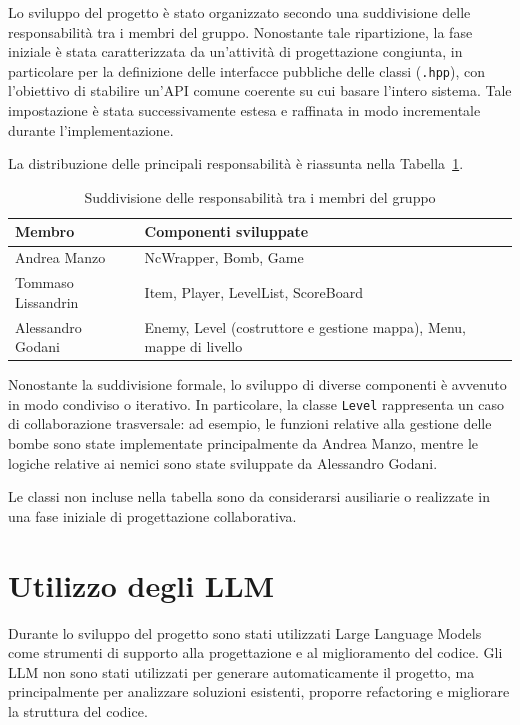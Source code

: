 \documentclass[a4paper,11pt]{article}
\begin{document}
Lo sviluppo del progetto è stato organizzato secondo una suddivisione delle responsabilità tra i membri del gruppo. 
Nonostante tale ripartizione, la fase iniziale è stata caratterizzata da un'attività di progettazione congiunta, 
in particolare per la definizione delle interfacce pubbliche delle classi (\texttt{.hpp}), 
con l'obiettivo di stabilire un'API comune coerente su cui basare l'intero sistema. 
Tale impostazione è stata successivamente estesa e raffinata in modo incrementale durante l'implementazione.

La distribuzione delle principali responsabilità è riassunta nella Tabella~\ref{tab:suddivisione}.

\bigskip

\begin{table}[h]
\centering
\begin{tabular}{|l|l|}
\hline
\textbf{Membro} & \textbf{Componenti sviluppate} \\
\hline
Andrea Manzo & NcWrapper, Bomb, Game \\
\hline
Tommaso Lissandrin & Item, Player, LevelList, ScoreBoard \\
\hline
Alessandro Godani & Enemy, Level (costruttore e gestione mappa), Menu, mappe di livello \\
\hline
\end{tabular}
\caption{Suddivisione delle responsabilità tra i membri del gruppo}
\label{tab:suddivisione}
\end{table}

Nonostante la suddivisione formale, lo sviluppo di diverse componenti è avvenuto in modo condiviso o iterativo. 
In particolare, la classe \texttt{Level} rappresenta un caso di collaborazione trasversale: 
ad esempio, le funzioni relative alla gestione delle bombe sono state implementate principalmente da Andrea Manzo, 
mentre le logiche relative ai nemici sono state sviluppate da Alessandro Godani.

Le classi non incluse nella tabella sono da considerarsi ausiliarie o realizzate in una fase iniziale 
di progettazione collaborativa.

\section{Utilizzo degli LLM}

Durante lo sviluppo del progetto sono stati utilizzati Large Language Models
come strumenti di supporto alla progettazione e al miglioramento del codice.
Gli LLM non sono stati utilizzati per generare automaticamente il progetto,
ma principalmente per analizzare soluzioni esistenti, proporre refactoring e
migliorare la struttura del codice.
\end{document}
